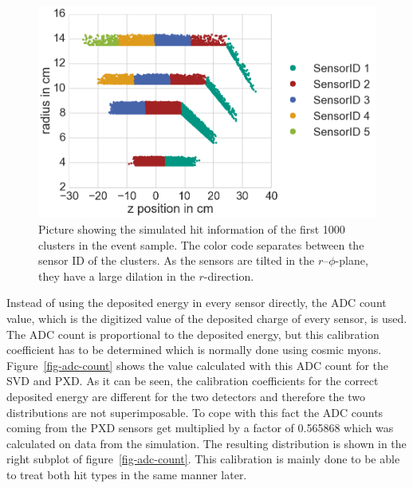 \begin{figure}
 \centering
 \includegraphics[width=0.7\linewidth]{figures/vxd/cluster_positions.png}
 \caption[Picture showing the simulated hit information.]{Picture showing the simulated hit information of the first 1000 clusters in the event sample. The color code separates between the sensor ID of the clusters. As the sensors are tilted in the $r$--$\phi$-plane, they have a large dilation in the $r$-direction.}
 \label{fig-cluster-position}
\end{figure}

Instead of using the deposited energy in every sensor directly, the ADC count value, which is the digitized value of the deposited charge of every sensor, is used. The ADC count is proportional to the deposited energy, but this calibration coefficient has to be determined which is normally done using cosmic myons. %
Figure~\ref{fig-adc-count} shows the \dedx value calculated with this ADC count for the SVD and PXD. As it can be seen, the calibration coefficients for the correct deposited energy are different for the two detectors and therefore the two distributions are not superimposable. To cope with this fact the ADC counts coming from the PXD sensors get multiplied by a factor of 0.565868 which was calculated on data from the simulation. The resulting distribution is shown in the right subplot of figure~\ref{fig-adc-count}. This calibration is mainly done to be able to treat both hit types in the same manner later. 

